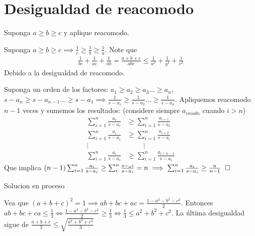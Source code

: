 \section{Desigualdad de reacomodo}

\begin{sol}
	Suponga $a\geq b\geq c $ y aplique reacomodo.
\end{sol}

\begin{sol}
	Suponga $a\geq b\geq c \implies \frac{1}{c} \geq \frac{1}{b} \geq \frac{1}{a}$. Note que
	\begin{align}
	\frac{1}{bc} + \frac{1}{ac} + \frac{1}{ab} = \frac{a+b+c}{abc} \leq \frac{1}{a^2} + \frac{1}{b^2} + \frac{1}{c^2}
	\end{align}
	Debido a la desigualdad de reacomodo.
\end{sol}

\begin{sol}
	Suponga un orden de los factores: $a_{1} \geq a_{2} \geq a_{3} \dots  \geq a_{n}$,  $s-a_{n} \geq s-a_{n-1} \dots  \geq s-a_{1} \implies \frac{1}{s-a_{1}} \geq \frac{1}{s-a_{2}} \dots \geq \frac{1}{s-a_{n}}$. Apliquemos reacomodo $n-1$ veces y sumemos los resultados: (considere siempre $a_{i mod n}$ cuando $i>n$)
	\begin{align}
	\sum_{i=1}^{n} \frac{a_{i}}{s-a_{i}} &\geq  \sum_{i=1}^{n} \frac{a_{i+1}}{s-a_{i}} \\
	\sum_{i=1}^{n} \frac{a_{i}}{s-a_{i}} &\geq  \sum_{i=1}^{n} \frac{a_{i+2}}{s-a_{i}} \\
	\vdots \hspace{1cm}&\hspace{1cm} \vdots \\
	\sum_{i=1}^{n} \frac{a_{i}}{s-a_{i}} &\geq  \sum_{i=1}^{n} \frac{a_{i+n-1}}{s-a_{i}}
	\end{align}
	Que implica $(n-1)\sum_{i=1}^{n} \frac{a_{i}}{s-a_{i}} \geq \sum_{i}^{n} \frac{s-_a{i}}{s-a_{i}} = n \implies \sum_{i=1}^{n} \frac{a_{i}}{s-a_{i}} \geq \frac{n}{n-1}\hspace{0.2cm}\square$
\end{sol}

\begin{sol}
	Solucion en proceso
\end{sol}

\begin{sol}
	Vea que $(a+b+c)^2 = 1 \implies ab+bc+ac = \frac{1-a^2-b^2-c^2}{2}$. Entonces $ab+bc+ca \leq \frac{1}{3} \iff \frac{1-a^2-b^2-c^2}{2} \geq \frac{1}{3} \iff \frac{1}{3} \leq a^2+b^2+c^2$. La \'ultima desigualdad sigue de $\frac{a+b+c}{3} \leq \sqrt{\frac{a^2+b^2+c^2}{3}}$
\end{sol}

